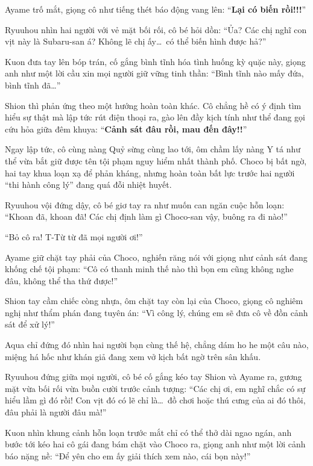 \documentclass[../main.tex]{subfiles}
\begin{document}
Ayame trố mắt, giọng cô như tiếng thét báo động vang lên: ``\textbf{Lại có biến rồi!!!}''

Ryuuhou nhìn hai người với vẻ mặt bối rối, cô bé hỏi dồn: ``Ủa? Các chị nghĩ con vịt này là Subaru-san á? Không lẽ chị ấy\dots\ có thể biến hình được hả?''

Kuon đưa tay lên bóp trán, cố gắng bình tĩnh hóa tình huống kỳ quặc này, giọng anh như một lời cầu xin mọi người giữ vững tinh thần: ``Bình tĩnh nào mấy đứa, bình tĩnh đã\dots''

Shion thì phản ứng theo một hướng hoàn toàn khác. Cô chẳng hề có ý định tìm hiểu sự thật mà lập tức rút điện thoại ra, gào lên đầy kịch tính như thể đang gọi cứu hỏa giữa đêm khuya: ``\textbf{Cảnh sát đâu rồi, mau đến đây!!}''

Ngay lập tức, cô cùng nàng Quỷ sừng cùng lao tới, ôm chầm lấy nàng Y tá như thể vừa bắt giữ được tên tội phạm nguy hiểm nhất thành phố. Choco bị bất ngờ, hai tay khua loạn xạ để phản kháng, nhưng hoàn toàn bất lực trước hai người ``thi hành công lý'' đang quá đỗi nhiệt huyết.

Ryuuhou vội đứng dậy, cô bé giơ tay ra như muốn can ngăn cuộc hỗn loạn: ``Khoan đã, khoan đã! Các chị định làm gì Choco-san vậy, buông ra đi nào!''


``Bỏ cô ra! T-Từ từ đã mọi người ơi!''

Ayame giữ chặt tay phải của Choco, nghiến răng nói với giọng như cảnh sát đang khống chế tội phạm: ``Cô có thanh minh thế nào thì bọn em cũng không nghe đâu, không thể tha thứ được!''

Shion tay cầm chiếc còng nhựa, ôm chặt tay còn lại của Choco, giọng cô nghiêm nghị như thẩm phán đang tuyên án: ``Vì công lý, chúng em sẽ đưa cô về đồn cảnh sát để xử lý!''

Aqua chỉ đứng đó nhìn hai người bạn cùng thế hệ, chẳng dám ho he một câu nào, miệng há hốc như khán giả đang xem vở kịch bất ngờ trên sân khấu.

Ryuuhou đứng giữa mọi người, cô bé cố gắng kéo tay Shion và Ayame ra, gương mặt vừa bối rối vừa buồn cười trước cảnh tượng: ``Các chị ơi, em nghĩ chắc có sự hiểu lầm gì đó rồi! Con vịt đó có lẽ chỉ là\dots\ đồ chơi hoặc thú cưng của ai đó thôi, đâu phải là người đâu mà!''

Kuon nhìn khung cảnh hỗn loạn trước mắt chỉ có thể thở dài ngao ngán, anh bước tới kéo hai cô gái đang bám chặt vào Choco ra, giọng anh như một lời cảnh báo nặng nề: ``Để yên cho em ấy giải thích xem nào, cái bọn này!''
\end{document}

